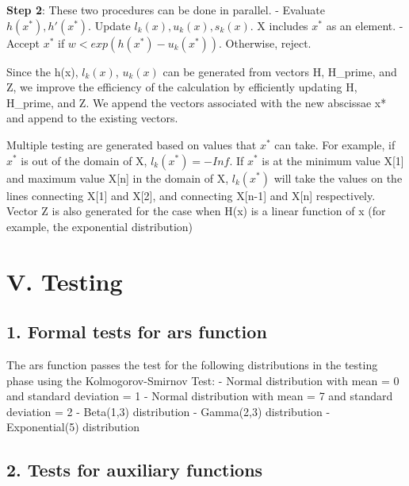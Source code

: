 \documentclass[]{article}
\begin{document}
\textbf{Step 2}: These two procedures can be done in parallel. \newline
- Evaluate \(h(x^{*}), h'(x^{*})\). Update
\(l_{k}(x), u_{k}(x), s_{k}(x)\). X includes \(x^{*}\) as an element.
\newline
- Accept \(x^{*}\) if \(w < exp(h(x^{*}) - u_{k}(x^{*}))\). Otherwise,
reject.

Since the h(x), \(l_{k}(x)\), \(u_{k}(x)\) can be generated from vectors
H, H\_prime, and Z, we improve the efficiency of the calculation by
efficiently updating H, H\_prime, and Z. We append the vectors
associated with the new abscissae x* and append to the existing vectors.

Multiple testing are generated based on values that \(x^*\) can take.
For example, if \(x^*\) is out of the domain of X,
\(l_{k}(x^{*})=-Inf\). If \(x^*\) is at the minimum value X{[}1{]} and
maximum value X{[}n{]} in the domain of X, \(l_{k}(x^{*})\) will take
the values on the lines connecting X{[}1{]} and X{[}2{]}, and connecting
X{[}n-1{]} and X{[}n{]} respectively. Vector Z is also generated for the
case when H(x) is a linear function of x (for example, the exponential
distribution)

\section{V. Testing}\label{v.-testing}

\subsection{1. Formal tests for ars
function}\label{formal-tests-for-ars-function}

The ars function passes the test for the following distributions in the
testing phase using the Kolmogorov-Smirnov Test: \newline
- Normal distribution with mean = 0 and standard deviation = 1 \newline
- Normal distribution with mean = 7 and standard deviation = 2 \newline
- Beta(1,3) distribution \newline
- Gamma(2,3) distribution \newline
- Exponential(5) distribution \newline

\subsection{2. Tests for auxiliary
functions}\label{tests-for-auxiliary-functions}
\end{document}
